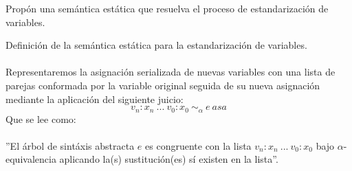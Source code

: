         \begin{exercise} 
	Propón una semántica estática que resuelva el proceso de estandarización de variables.
    \end{exercise}
	\begin{definition} Definición de la semántica estática para la estandarización de variables.\\\\
	Representaremos la asignación serializada de nuevas variables con una lista de parejas conformada por la variable original seguida de su nueva asignación mediante la aplicación del siguiente juicio: $$v_n:x_n\ ...\ v_0:x_0\ \sim_{\alpha}\ e\ asa$$ 
          Que se lee como: \\\\
	''El árbol de sintáxis abstracta $e$ es congruente con la lista $v_n: x_n\ ...\ v_0:x_0$ bajo $\alpha$-equivalencia aplicando la(s) sustitución(es) sí existen en la lista''.\\


\end{definition}

